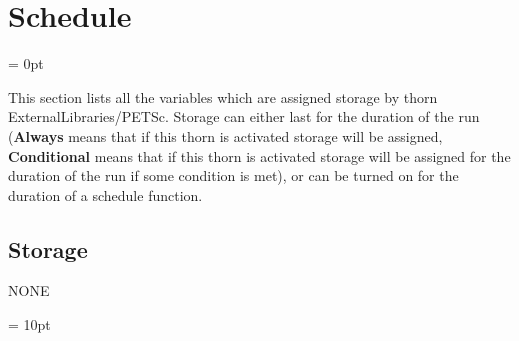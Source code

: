 
\section{Schedule} 


\parskip = 0pt


\noindent This section lists all the variables which are assigned storage by thorn ExternalLibraries/PETSc.  Storage can either last for the duration of the run ({\bf Always} means that if this thorn is activated storage will be assigned, {\bf Conditional} means that if this thorn is activated storage will be assigned for the duration of the run if some condition is met), or can be turned on for the duration of a schedule function.


\subsection*{Storage}NONE

\vspace{5mm}\parskip = 10pt 
